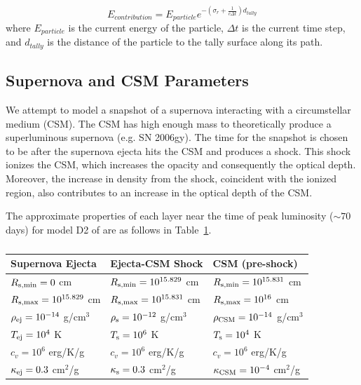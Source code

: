 \begin{equation}\label{Eq: tally_contr}
E_{contribution} = E_{particle}e^{-(\sigma_{r} + \frac{1}{c \Delta t})d_{tally}}
\end{equation}
where $E_{particle}$ is the current energy of the particle, $\Delta t$ is the current time step, and $d_{tally}$ is the distance of the particle to the tally surface along its path.

\subsection{Supernova and CSM Parameters} \label{sec:sncsmpars}
We attempt to model a snapshot of a supernova interacting with a circumstellar medium (CSM). The CSM has high enough mass to theoretically produce a superluminous supernova (e.g. SN 2006gy). The time for the snapshot is chosen to be after the supernova ejecta hits the CSM and produces a shock. This shock ionizes the CSM, which increases the opacity and consequently the optical depth. Moreover, the increase in density from the shock, coincident with the ionized region, also contributes to an increase in the optical depth of the CSM.

The approximate properties of each layer near the time of peak luminosity ($\sim70$ days) for model D2 of \cite{MB13} are as follows in Table~\ref{tab:supernova_params}.

\begin{table}[h!]
	\centering
	\begin{tabular}{lll}
		\toprule
		Supernova Ejecta & Ejecta-CSM Shock & CSM (pre-shock) \\ 
		\midrule
		$R_{\rm s, min} = 0$ cm & $R_{\rm s, min} = 10^{15.829}$ cm & $R_{\rm s, min} = 10^{15.831}$ cm \\ 
		$R_{\rm s, max} = 10^{15.829}$ cm & $R_{\rm s, max} = 10^{15.831}$ cm & $R_{\rm s, max} = 10^{16}$ cm \\ 
		$\rho_{\rm ej} = 10^{-14}$ g/cm$^3$ & $\rho_{\rm s} = 10^{-12}$ g/cm$^3$ & $\rho_{\rm CSM} = 10^{-14}$ g/cm$^3$ \\ 
		$T_{\rm ej} = 10^4$ K & $T_{\rm s} = 10^6$ K & $T_{\rm s} = 10^4$ K \\ 
		$c_v = 10^6$ erg/K/g & $c_v = 10^6$ erg/K/g & $c_v = 10^6$ erg/K/g \\ 
		$\kappa_{\rm ej} = 0.3$ cm$^2$/g & $\kappa_{\rm s} = 0.3$ cm$^2$/g & $\kappa_{\rm CSM} = 10^{-4}$ cm$^2$/g \\ 
		\bottomrule
	\end{tabular}
	\caption{}
	\label{tab:supernova_params}
\end{table}

